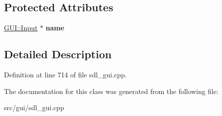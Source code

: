 \subsection*{Protected Attributes}
\begin{DoxyCompactItemize}
\item 
\hypertarget{classSetLocalSize_a04b30f6369fc83b25a0047080f78fa2c}{\hyperlink{classGUI_1_1Input}{G\-U\-I\-::\-Input} $\ast$ {\bfseries name}}\label{classSetLocalSize_a04b30f6369fc83b25a0047080f78fa2c}

\end{DoxyCompactItemize}


\subsection{Detailed Description}


Definition at line 714 of file sdl\-\_\-gui.\-cpp.



The documentation for this class was generated from the following file\-:\begin{DoxyCompactItemize}
\item 
src/gui/sdl\-\_\-gui.\-cpp\end{DoxyCompactItemize}
